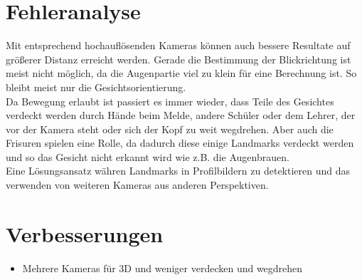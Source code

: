 \section{Fehleranalyse}
Mit entsprechend hochauflösenden Kameras können auch bessere Resultate auf größerer Distanz erreicht werden. Gerade die Bestimmung der Blickrichtung ist meist nicht möglich, da die Augenpartie viel zu klein für eine Berechnung ist. So bleibt meist nur die Gesichtsorientierung.\\
Da Bewegung erlaubt ist passiert es immer wieder, dass Teile des Gesichtes verdeckt werden durch Hände beim Melde, andere Schüler oder dem Lehrer, der vor der Kamera steht oder sich der Kopf zu weit wegdrehen. Aber auch die Frisuren spielen eine Rolle, da dadurch diese einige Landmarks verdeckt werden und so das Gesicht nicht erkannt wird wie z.B. die Augenbrauen.\\
Eine Lösungsansatz währen Landmarks in Profilbildern zu detektieren und das verwenden von weiteren Kameras aus anderen Perspektiven.\\
\section{Verbesserungen}
\begin{itemize}
	\item Mehrere Kameras für 3D und weniger verdecken und wegdrehen
\end{itemize}